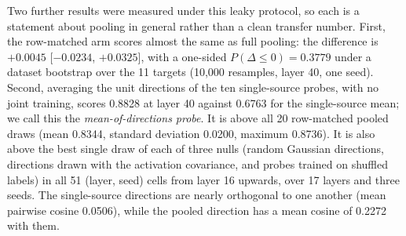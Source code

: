 Two further results were measured under this leaky protocol, so each is a statement about pooling in general rather than a clean transfer number.
First, the row-matched arm scores almost the same as full pooling: the difference is $+0.0045$ [$-0.0234$, $+0.0325$], with a one-sided $P(\Delta\le 0)=0.3779$ under a dataset bootstrap over the 11 targets (10{,}000 resamples, layer 40, one seed). %
Second, averaging the unit directions of the ten single-source probes, with no joint training, scores 0.8828 at layer 40 against 0.6763 for the single-source mean; we call this the \emph{mean-of-directions probe}. %
It is above all 20 row-matched pooled draws (mean 0.8344, standard deviation 0.0200, maximum 0.8736). %
It is also above the best single draw of each of three nulls (random Gaussian directions, directions drawn with the activation covariance, and probes trained on shuffled labels) in all 51 (layer, seed) cells from layer 16 upwards, over 17 layers and three seeds. %
The single-source directions are nearly orthogonal to one another (mean pairwise cosine 0.0506), while the pooled direction has a mean cosine of 0.2272 with them. %

